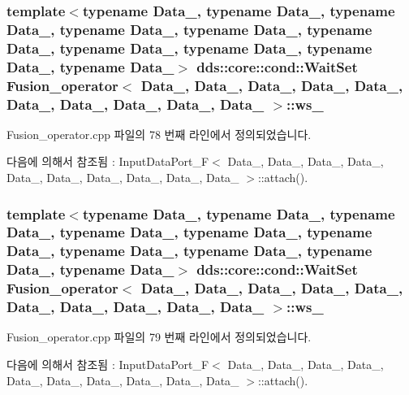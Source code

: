 \subsubsection[{\texorpdfstring{ws\+\_\+3}{ws_3}}]{\setlength{\rightskip}{0pt plus 5cm}template$<$typename Data\+\_, typename Data\+\_, typename Data\+\_, typename Data\+\_, typename Data\+\_, typename Data\+\_, typename Data\+\_, typename Data\+\_, typename Data\+\_, typename Data\+\_$>$ dds\+::core\+::cond\+::\+Wait\+Set {\bf Fusion\+\_\+operator}$<$ Data\+\_, Data\+\_, Data\+\_, Data\+\_, Data\+\_, Data\+\_, Data\+\_, Data\+\_, Data\+\_, Data\+\_ $>$\+::ws\+\_}\hypertarget{classFusion__operator_a31133e7918c57cbca7cc42f141ff672d}{}\label{classFusion__operator_a31133e7918c57cbca7cc42f141ff672d}


Fusion\+\_\+operator.\+cpp 파일의 78 번째 라인에서 정의되었습니다.



다음에 의해서 참조됨 \+:  Input\+Data\+Port\+\_\+\+F$<$ Data\+\_, Data\+\_, Data\+\_, Data\+\_, Data\+\_, Data\+\_, Data\+\_, Data\+\_, Data\+\_, Data\+\_ $>$\+::attach().

\subsubsection[{\texorpdfstring{ws\+\_\+4}{ws_4}}]{\setlength{\rightskip}{0pt plus 5cm}template$<$typename Data\+\_, typename Data\+\_, typename Data\+\_, typename Data\+\_, typename Data\+\_, typename Data\+\_, typename Data\+\_, typename Data\+\_, typename Data\+\_, typename Data\+\_$>$ dds\+::core\+::cond\+::\+Wait\+Set {\bf Fusion\+\_\+operator}$<$ Data\+\_, Data\+\_, Data\+\_, Data\+\_, Data\+\_, Data\+\_, Data\+\_, Data\+\_, Data\+\_, Data\+\_ $>$\+::ws\+\_}\hypertarget{classFusion__operator_a5dea84d5320494140d650bc0823d56f2}{}\label{classFusion__operator_a5dea84d5320494140d650bc0823d56f2}


Fusion\+\_\+operator.\+cpp 파일의 79 번째 라인에서 정의되었습니다.



다음에 의해서 참조됨 \+:  Input\+Data\+Port\+\_\+\+F$<$ Data\+\_, Data\+\_, Data\+\_, Data\+\_, Data\+\_, Data\+\_, Data\+\_, Data\+\_, Data\+\_, Data\+\_ $>$\+::attach().


